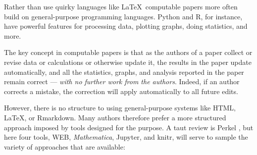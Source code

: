 \documentclass{comjnl}
\begin{document}
Rather than use quirky languages like \LaTeX\ computable papers more often build on general-purpose programming languages. Python and R, for instance, have powerful features for processing data, plotting graphs, doing statistics, and more.

The key concept in computable papers is that as the authors of a paper collect or revise data or calculations or otherwise update it, the results in the paper update automatically, and all the statistics, graphs, and analysis reported in the paper remain correct --- \emph{with no further work from the authors}. Indeed, if an author corrects a mistake, the correction will apply automatically to all future edits.

However, there is no structure to using general-purpose systems like HTML, \LaTeX, or Rmarkdown. Many authors therefore prefer a more structured approach imposed by tools designed for the purpose. A taut review is Perkel \cite{perkel-review}, but here four tools,  WEB, \emph{Mathematica}, Jupyter, and knitr, will serve to sample the variety of approaches that are available:
\end{document}

